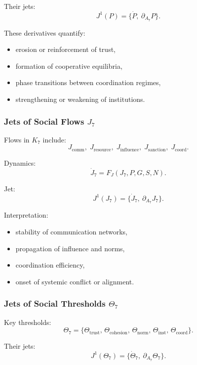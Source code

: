 Their jets:
\[
J^1(P)=\{\dot{P},\ \partial_{A_7}P\}.
\]

These derivatives quantify:
\begin{itemize}
    \item erosion or reinforcement of trust,
    \item formation of cooperative equilibria,
    \item phase transitions between coordination regimes,
    \item strengthening or weakening of institutions.
\end{itemize}


\subsubsection{Jets of Social Flows \texorpdfstring{$J_7$}{J_7}}

Flows in $K_7$ include:
\[
J_{\mathrm{comm}},\;
J_{\mathrm{resource}},\;
J_{\mathrm{influence}},\;
J_{\mathrm{sanction}},\;
J_{\mathrm{coord}}.
\]

Dynamics:
\[
\dot{J}_7 = F_J(J_7, P, G, S, N).
\]

Jet:
\[
J^1(J_7)=\{\dot{J}_7,\ \partial_{A_7}J_7\}.
\]

Interpretation:
\begin{itemize}
    \item stability of communication networks,
    \item propagation of influence and norms,
    \item coordination efficiency,
    \item onset of systemic conflict or alignment.
\end{itemize}


\subsubsection{Jets of Social Thresholds \texorpdfstring{$\Theta_7$}{\Theta_7}}

Key thresholds:
\[
\Theta_7 =
\{
\Theta_{\mathrm{trust}},\,
\Theta_{\mathrm{cohesion}},\,
\Theta_{\mathrm{norm}},\,
\Theta_{\mathrm{inst}},\,
\Theta_{\mathrm{coord}}
\}.
\]

Their jets:
\[
J^1(\Theta_7)=\{\dot{\Theta}_7,\ \partial_{A_7}\Theta_7\}.
\]

